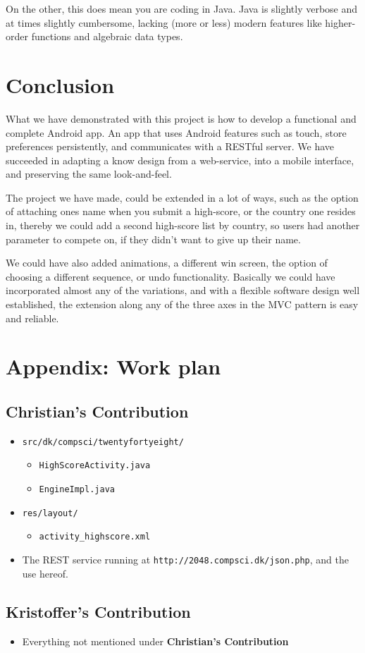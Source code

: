 \documentclass[a4paper, 12pt]{article}
\newcommand{\code}[1]{\texttt{#1}}
\begin{document}
On the other, this does mean you are coding in Java. Java is slightly
verbose and at times slightly cumbersome, lacking (more or less)
modern features like higher-order functions and algebraic data types. 

\section{Conclusion}
What we have demonstrated with this project is how to develop a
functional and complete Android app. An app that uses Android features
such as touch, store preferences persistently, and communicates with a
RESTful server. We have succeeded in adapting a know design from a
web-service, into a mobile interface, and preserving the same
look-and-feel.

The project we have made, could be extended in a lot of ways, such as
the option of attaching ones name when you submit a high-score, or the
country one resides in, thereby we could add a second high-score list
by country, so users had another parameter to compete on, if they
didn't want to give up their name.

We could have also added animations, a different win screen, the
option of choosing a different sequence, or undo
functionality. Basically we could have incorporated almost any of the
variations, and with a flexible software design well established, the
extension along any of the three axes in the MVC pattern is easy and
reliable.

\newpage
\appendix
\section{Appendix: Work plan}
\subsection{Christian's Contribution}
\begin{itemize}
\item \code{src/dk/compsci/twentyfortyeight/}
  \begin{itemize}
  \item \code{HighScoreActivity.java}
  \item \code{EngineImpl.java}
  \end{itemize}
\item \code{res/layout/}
  \begin{itemize}
  \item \code{activity\_highscore.xml}
  \end{itemize}
\item The REST service running at \code{http://2048.compsci.dk/json.php}, and the use hereof.
\end{itemize}
\subsection{Kristoffer's Contribution}
\begin{itemize}
\item Everything not mentioned under \textbf{Christian's Contribution}
\end{itemize}
\end{document}

